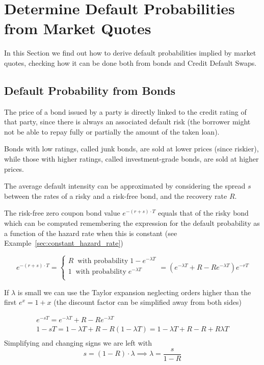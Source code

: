 \section{Determine Default Probabilities from Market Quotes}
In this Section we find out how to derive default probabilities implied by market quotes, checking how it can be done both from bonds and Credit Default Swaps.

\subsection{Default Probability from Bonds}
\label{default-probabilities-and-bond-prices}

The price of a bond issued by a party is directly linked to the credit rating of that party, since there is always an associated default risk (the borrower might not be able to repay fully or partially the amount of the taken loan). 

Bonds with low ratings, called junk bonds, are sold at lower prices (since riskier), while those with higher ratings, called investment-grade bonds, are sold at higher prices.

The average default intensity can be approximated by considering the spread $s$ between the rates of a risky and a risk-free bond, and the recovery rate $R$.

The risk-free zero coupon bond value $e^{-(r+s)\cdot T}$ equals that of the risky bond which can be computed remembering the expression for the default probability as a function of the hazard rate when this is constant (see Example~\ref{sec:constant_hazard_rate})

\begin{equation}
e^{-(r+s)\cdot T} = 
\begin{cases}
R\;\;\textrm{with probability}\;1 - e^{-\lambda T} \\
1\;\;\textrm{with probability}\;e^{-\lambda T} \\
\end{cases} = 
(e^{-\lambda T} + R - R e^{-\lambda T})e^{-rT}
\end{equation}

If $\lambda$ is small we can use the Taylor expansion neglecting orders higher than the first $e^{x} = 1 + x$ (the discount factor can be simplified away from both sides)

\begin{equation}
\begin{gathered}
e^{-sT} = e^{-\lambda T} + R - R e^{-\lambda T} \\
1 - sT = 1 - \lambda T + R - R(1 - \lambda T) = 1 - \lambda T + R - R + R\lambda T\\
\end{gathered}
\end{equation}
Simplifying and changing signs we are left with
\begin{equation}
s = (1 - R)\cdot \lambda \implies \lambda = \frac{s}{1-R}
\end{equation}

